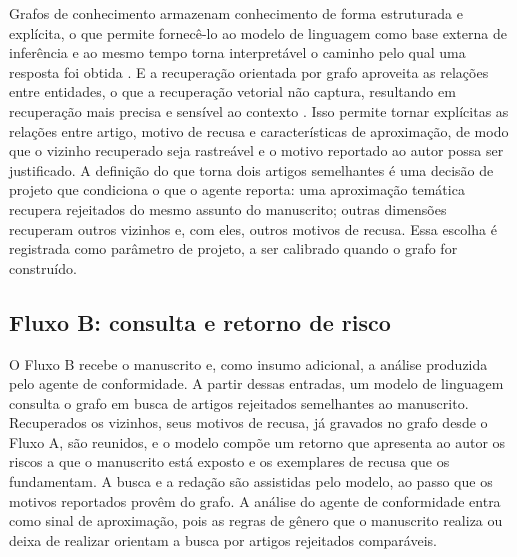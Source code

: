 Grafos de conhecimento armazenam conhecimento de forma estruturada e explícita, o que permite fornecê-lo ao modelo de linguagem como base externa de inferência e ao mesmo tempo torna interpretável o caminho pelo qual uma resposta foi obtida \cite{PanKGLLM2024}. E a recuperação orientada por grafo aproveita as relações entre entidades, o que a recuperação vetorial não captura, resultando em recuperação mais precisa e sensível ao contexto \cite{PengGraphRAG}. Isso permite tornar explícitas as relações entre artigo, motivo de recusa e características de aproximação, de modo que o vizinho recuperado seja rastreável e o motivo reportado ao autor possa ser justificado. A definição do que torna dois artigos semelhantes é uma decisão de projeto que condiciona o que o agente reporta: uma aproximação temática recupera rejeitados do mesmo assunto do manuscrito; outras dimensões recuperam outros vizinhos e, com eles, outros motivos de recusa. Essa escolha é registrada como parâmetro de projeto, a ser calibrado quando o grafo for construído.

\subsection{Fluxo B: consulta e retorno de risco}
\label{sec:fluxo-b-fronteira}

O Fluxo B recebe o manuscrito e, como insumo adicional, a análise produzida pelo agente de conformidade. A partir dessas entradas, um modelo de linguagem consulta o grafo em busca de artigos rejeitados semelhantes ao manuscrito. Recuperados os vizinhos, seus motivos de recusa, já gravados no grafo desde o Fluxo A, são reunidos, e o modelo compõe um retorno que apresenta ao autor os riscos a que o manuscrito está exposto e os exemplares de recusa que os fundamentam. A busca e a redação são assistidas pelo modelo, ao passo que os motivos reportados provêm do grafo. A análise do agente de conformidade entra como sinal de aproximação, pois as regras de gênero que o manuscrito realiza ou deixa de realizar orientam a busca por artigos rejeitados comparáveis.

